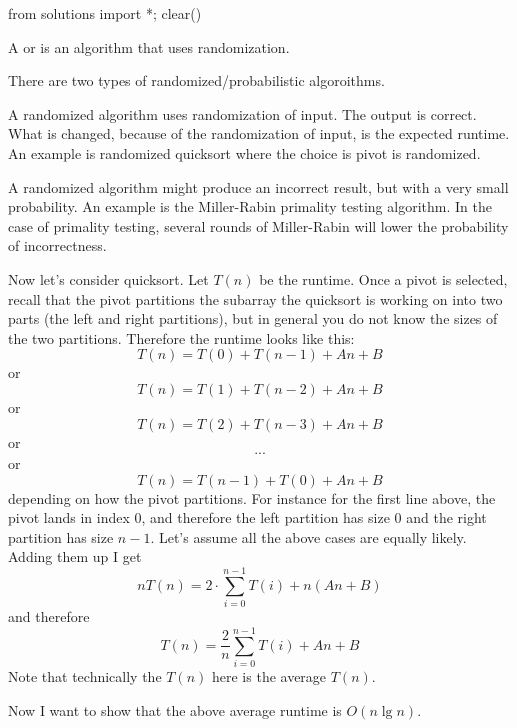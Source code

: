 \begin{python0}
from solutions import *; clear()
\end{python0}


A
or
is an algorithm that uses
randomization.

There are two types of randomized/probabilistic algoroithms.

A  randomized algorithm uses randomization of input.
The output is correct.
What is changed, because of the randomization of input, is the expected runtime.
An example is randomized quicksort where the choice is pivot is randomized.

A  randomized algorithm might produce an incorrect result,
but with a very small probability.
An example is the Miller-Rabin primality testing algorithm.
In the case of primality testing, several rounds of Miller-Rabin will lower
the probability of incorrectness.

Now let's consider quicksort.
Let $T(n)$ be the runtime.
Once a pivot is selected, recall that the
pivot partitions the subarray the quicksort is working on
into two parts (the left and right partitions),
but in general you do not know the sizes of the two partitions.
Therefore the runtime looks like this:
\[
  T(n) = T(0) + T(n - 1) + An + B
\]
or
\[
  T(n) = T(1) + T(n - 2) + An + B
\]
or
\[
  T(n) = T(2) + T(n - 3) + An + B
\]
or
\[
  ...
\]
or
\[
  T(n) = T(n - 1) + T(0) + An + B
\]
depending on how the pivot partitions.
For instance for the first line above, the pivot lands in index 0,
and therefore the left partition has size 0 and the right partition
has size $n - 1$.
Let's assume all the above cases are equally likely.
Adding them up I get
\[
  nT(n) = 2 \cdot \sum_{i = 0}^{n - 1} T(i) + n(An + B)
\]
and therefore
\[
  T(n) = \frac{2}{n} \sum_{i = 0}^{n - 1} T(i) + An + B
\]
Note that technically the $T(n)$ here is the average $T(n)$.

Now I want to show that the above average runtime is $O(n \lg n)$.

